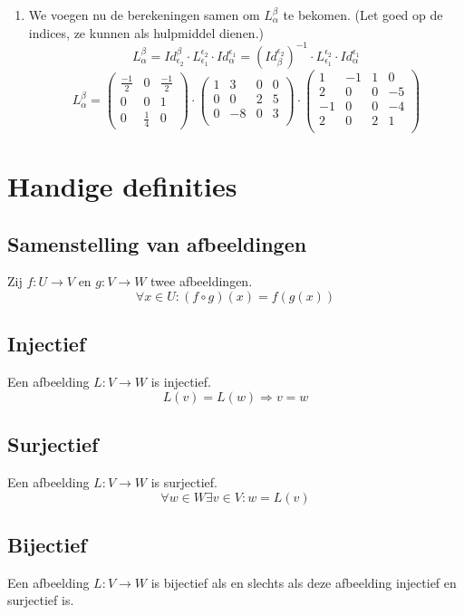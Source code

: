 \documentclass[lineaire_algebra_oplossingen.tex]{subfiles}
\begin{document}
\begin{enumerate}
\item
We voegen nu de berekeningen samen om $L_{\alpha}^{\beta}$ te bekomen. (Let goed op de indices, ze kunnen als hulpmiddel dienen.)
\[
L_{\alpha}^{\beta}
= Id_{\epsilon_2}^{\beta} \cdot L_{\epsilon_1}^{\epsilon_2} \cdot Id_{\alpha}^{\epsilon_1} 
= (Id_{\beta}^{\epsilon_2})^{-1} \cdot L_{\epsilon_1}^{\epsilon_2} \cdot Id_{\alpha}^{\epsilon_1} 
\]
\[
L_{\alpha}^{\beta} = 
\begin{pmatrix}
\frac{-1}{2} & 0 & \frac{-1}{2}\\
0 & 0 & 1\\
0 & \frac{1}{4} & 0
\end{pmatrix}
\cdot
\begin{pmatrix}
1 & 3 & 0 & 0\\
0 & 0 & 2 & 5\\
0 & -8 &0 & 3\\
\end{pmatrix}
\cdot 
\begin{pmatrix}
1 & -1 & 1 & 0\\
2 & 0 & 0 & -5\\
-1 & 0 & 0 & -4\\
2 & 0 & 2 & 1\\
\end{pmatrix}
\]


\end{enumerate}




\chapter{Handige definities}
\section{Samenstelling van afbeeldingen}
\label{samenstelling_van_afbeeldingen}
Zij $f: U \rightarrow V$ en $g: V\rightarrow W$ twee afbeeldingen.
\[
\forall x\in U: (f \circ g)(x) = f(g(x))
\]

\section{Injectief}
\label{injectief}
Een afbeelding $L: V \rightarrow W$ is injectief.
\[
L(v) = L(w) \Rightarrow v = w
\]

\section{Surjectief}
\label{surjectief}
Een afbeelding $L: V \rightarrow W$ is surjectief.
\[
\forall w \in W \exists v \in V: w=L(v)
\]

\section{Bijectief}
\label{bijectief}
Een afbeelding $L: V \rightarrow W$ is bijectief als en slechts als deze afbeelding injectief en surjectief is.
\end{document}
